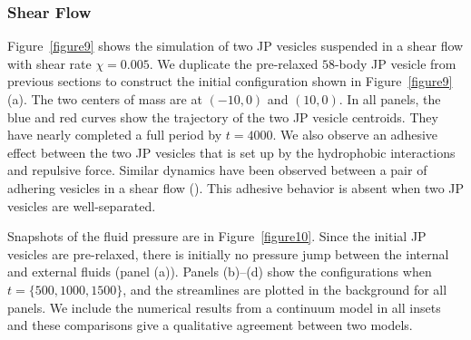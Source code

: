 \documentclass[lineno]{jfm}
\begin{document}
\subsubsection{Shear Flow}

Figure~\ref{figure9} shows the simulation of two JP vesicles suspended
in a shear flow with shear rate $\chi=0.005$. We duplicate the
pre-relaxed $58$-body JP vesicle from previous sections to construct the
initial configuration shown in Figure~\ref{figure9}(a). The two centers
of mass are at $(-10,0)$ and $(10,0)$. In all panels, the blue and red
curves show the trajectory of the two JP vesicle centroids. They have
nearly completed a full period by $t=4000$. We also observe an adhesive
effect between the two JP vesicles that is set up by the hydrophobic
interactions and repulsive force. Similar dynamics have been observed
between a pair of adhering vesicles in a shear flow
(\cite{qua-vee-you2019, abb-far-ezz-ben-mis2021}). This adhesive
behavior is absent when two JP vesicles are well-separated.

Snapshots of the fluid pressure are in Figure~\ref{figure10}. Since the
initial JP vesicles are pre-relaxed, there is initially no pressure jump
between the internal and external fluids (panel (a)). Panels (b)--(d)
show the configurations when $t = \{500,1000,1500\}$, and the
streamlines are plotted in the background for all panels. We include the
numerical results from a continuum model in all insets and these
comparisons give a qualitative agreement between two models.
\end{document}
